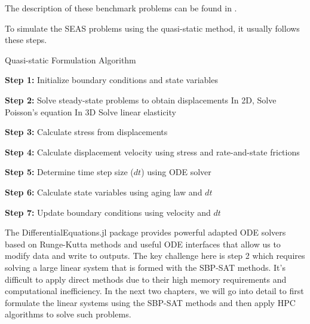 The description of these benchmark problems can be found in \cite{erickson2018seas,jiang2020seas}.

To simulate the SEAS problems using the quasi-static method, it usually follows these steps.

\begin{algorithm}
    \caption{Quasi-static Formulation Algorithm}
    \begin{algorithmic}[1]
        \State \textbf{Step 1:} Initialize boundary conditions and state variables
        
            \State \textbf{Step 2:} Solve steady-state problems to obtain displacements
            \State \hspace{1em} In 2D, Solve Poisson's equation
            \State \hspace{1em} In 3D Solve linear elasticity
            
            \State \textbf{Step 3:} Calculate stress from displacements
            
            \State \textbf{Step 4:} Calculate displacement velocity using stress and rate-and-state frictions
            
            \State \textbf{Step 5:} Determine time step size ($dt$) using ODE solver
            
            \State \textbf{Step 6:} Calculate state variables using aging law and $dt$
            
            \State \textbf{Step 7:} Update boundary conditions using velocity and $dt$
        \EndWhile
    \end{algorithmic}
\end{algorithm}

The DifferentialEquations.jl package provides powerful adapted ODE solvers based on Runge-Kutta methods and useful ODE interfaces that allow us to modify data and write to outputs.
The key challenge here is step 2 which requires solving a large linear system that is formed with the SBP-SAT methods.
It's difficult to apply direct methods due to their high memory requirements and computational inefficiency. 
In the next two chapters, we will go into detail to first formulate the linear systems using the SBP-SAT methods and then apply HPC algorithms to solve such problems.
